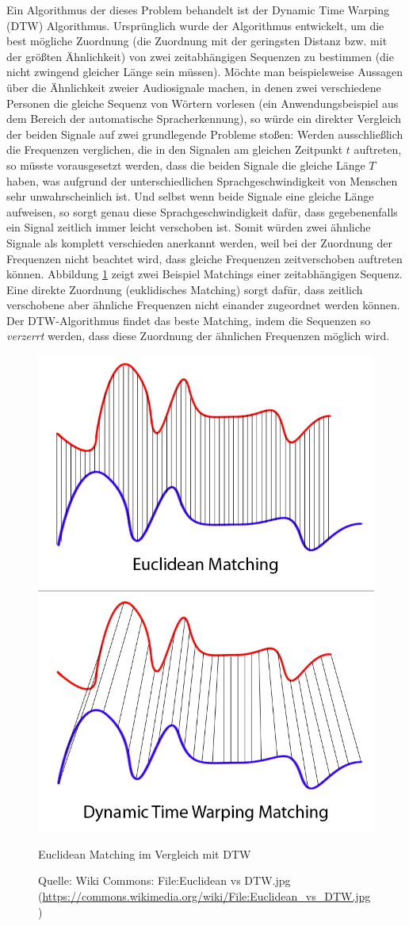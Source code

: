 \documentclass{whswinvcbook}
\begin{document}
Ein Algorithmus der dieses Problem behandelt ist der Dynamic Time Warping (DTW) Algorithmus. Ursprünglich wurde der Algorithmus entwickelt, um die best mögliche Zuordnung (die Zuordnung mit der geringsten Distanz bzw. mit der größten Ähnlichkeit) von zwei zeitabhängigen Sequenzen zu bestimmen (die nicht zwingend gleicher Länge sein müssen). Möchte man beispielsweise Aussagen über die Ähnlichkeit zweier Audiosignale machen, in denen zwei verschiedene Personen die gleiche Sequenz von Wörtern vorlesen (ein Anwendungsbeispiel aus dem Bereich der automatische Spracherkennung), so würde ein direkter Vergleich der beiden Signale auf zwei grundlegende Probleme stoßen: Werden ausschließlich die Frequenzen verglichen, die in den Signalen am gleichen Zeitpunkt $t$ auftreten, so müsste vorausgesetzt werden, dass die beiden Signale die gleiche Länge $T$ haben, was aufgrund der unterschiedlichen Sprachgeschwindigkeit von Menschen sehr unwahrscheinlich ist. Und selbst wenn beide Signale eine gleiche Länge aufweisen, so sorgt genau diese Sprachgeschwindigkeit dafür, dass gegebenenfalls ein Signal zeitlich immer leicht verschoben ist. Somit würden zwei ähnliche Signale als komplett verschieden anerkannt werden, weil bei der Zuordnung der Frequenzen nicht beachtet wird, dass gleiche Frequenzen zeitverschoben auftreten können. Abbildung \ref{fig-dtw-vs} zeigt zwei Beispiel Matchings einer zeitabhängigen Sequenz. Eine direkte Zuordnung (euklidisches Matching) sorgt dafür, dass zeitlich verschobene aber ähnliche Frequenzen nicht einander zugeordnet werden können. Der DTW-Algorithmus findet das beste Matching, indem die Sequenzen so \textit{verzerrt} werden, dass diese Zuordnung der ähnlichen Frequenzen möglich wird.
\begin{figure}[H]
    \centering
    \includegraphics[width=0.60\linewidth]{img/eu_vs_dtw.jpg}
    \caption{Euclidean Matching im Vergleich mit DTW}
    \caption*{Quelle: Wiki Commons: File:Euclidean vs DTW.jpg (\url{https://commons.wikimedia.org/wiki/File:Euclidean_vs_DTW.jpg})}
    \label{fig-dtw-vs}
\end{figure}
\end{document}
